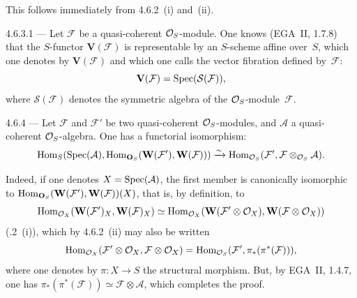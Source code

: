This follows immediately from 4.6.2~(i) and~(ii).

\begin{notation}{4.6.3.1}\label{I.4.6.3.1}
--- Let \(\mathcal{F}\) be a quasi-coherent \(\mathcal{O}_S\)-module. One knows (EGA~II, 1.7.8) that the \(S\)-functor \(\mathbf{V}(\mathcal{F})\) is representable by an \(S\)-scheme affine over~\(S\), which one denotes by \(\mathbf{V}(\mathcal{F})\) and which one calls the vector fibration%
{\renewcommand{\thefootnote}{(33)}}
defined by~\(\mathcal{F}\):
\[
\mathbf{V}(\mathcal{F}) = \operatorname{Spec}(\mathcal{S}(\mathcal{F})),
\]
where \(\mathcal{S}(\mathcal{F})\) denotes the symmetric algebra of the \(\mathcal{O}_S\)-module~\(\mathcal{F}\).%
{\renewcommand{\thefootnote}{(34)}}
\end{notation}

\begin{proposition}{4.6.4}\label{I.4.6.4}
--- Let \(\mathcal{F}\) and \(\mathcal{F}'\) be two quasi-coherent \(\mathcal{O}_S\)-modules, and \(\mathcal{A}\) a quasi-coherent \(\mathcal{O}_S\)-algebra. One has a functorial isomorphism:
\[
\operatorname{Hom}_S(\operatorname{Spec}(\mathcal{A}), \operatorname{Hom}_{\mathbf{O}_S}(\mathbf{W}(\mathcal{F}'), \mathbf{W}(\mathcal{F}))) \xrightarrow{\sim} \operatorname{Hom}_{\mathcal{O}_S}(\mathcal{F}', \mathcal{F} \otimes_{\mathcal{O}_S} \mathcal{A}).
\]
\end{proposition}

Indeed, if one denotes \(X = \operatorname{Spec}(\mathcal{A})\), the first member is canonically isomorphic to \(\operatorname{Hom}_{\mathbf{O}_S}(\mathbf{W}(\mathcal{F}'), \mathbf{W}(\mathcal{F}))(X)\), that is, by definition, to
\[
\operatorname{Hom}_{\mathcal{O}_X}(\mathbf{W}(\mathcal{F}')_X, \mathbf{W}(\mathcal{F})_X) \simeq \operatorname{Hom}_{\mathcal{O}_X}(\mathbf{W}(\mathcal{F}' \otimes \mathcal{O}_X), \mathbf{W}(\mathcal{F} \otimes \mathcal{O}_X))
\]
(.2~(i)), which by 4.6.2~(ii) may also be written
\[
\operatorname{Hom}_{\mathcal{O}_X}(\mathcal{F}' \otimes \mathcal{O}_X, \mathcal{F} \otimes \mathcal{O}_X) = \operatorname{Hom}_{\mathcal{O}_S}(\mathcal{F}', \pi_*(\pi^*(\mathcal{F}))),
\]
where one denotes by \(\pi \colon X \to S\) the structural morphism. But, by EGA~II, 1.4.7, one has \(\pi_*(\pi^*(\mathcal{F})) \simeq \mathcal{F} \otimes \mathcal{A}\), which completes the proof.

